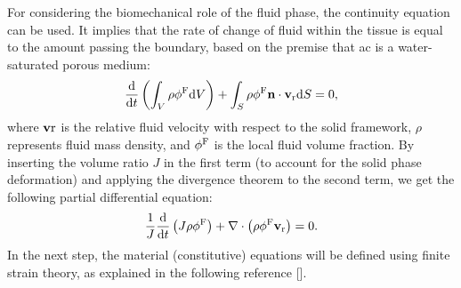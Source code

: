 \documentclass[12pt,a4paper]{report}
\begin{document}
For considering the biomechanical role of the fluid phase, the continuity equation can be used. It implies that the rate of change of fluid within the tissue is equal to the amount passing the boundary, based on the premise that \ac{ac} is a water-saturated porous medium:
%
\begin{equation}
    \frac{{\rm d}}{{\rm d}t}\left ( \int_V \rho \phi^{\rm F} {\rm d}V \right ) + \int_S \rho \phi^{\rm F} \textbf{n} \cdot \textbf{v}_{\rm r} {\rm d}S = 0,
\end{equation}
%
where $\textbf{v}{\rm r}$ is the relative fluid velocity with respect to the solid framework, $\rho$ represents fluid mass density, and $\phi^{\rm F}$ is the local fluid volume fraction. By inserting the volume ratio $J$ in the first term (to account for the solid phase deformation) and applying the divergence theorem to the second term, we get the following partial differential equation:
%
\begin{equation}\label{eq-pde}
    \frac{1}{J}\frac{{\rm d}}{{\rm d}t}\left (J\rho \phi^{\rm F} \right ) + \nabla \cdot \left ( \rho \phi^{\rm F} \textbf{v}_{\rm r} \right ) = 0.
\end{equation}
%
In the next step, the material (constitutive) equations will be defined using finite strain theory, as explained in the following reference [\cite{gerhard-book}].
\end{document}

